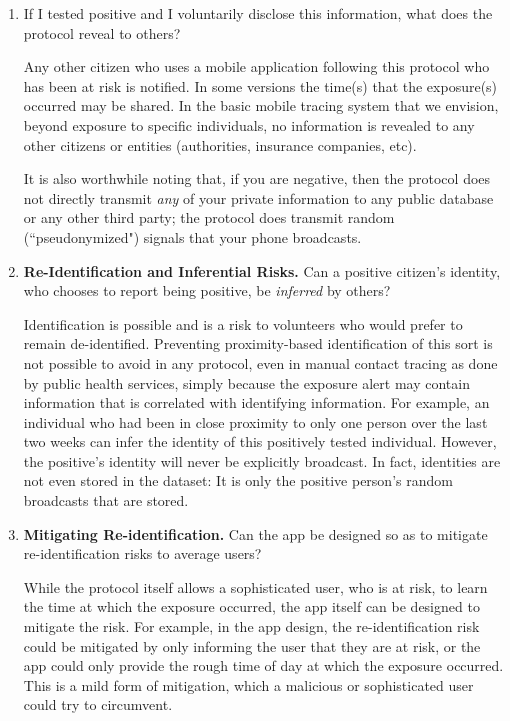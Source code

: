 \begin{enumerate}[leftmargin=*]
\item If I tested positive and I voluntarily disclose this information, what does the protocol reveal to others?

Any other citizen who uses a mobile application following this protocol who has been at risk is notified. In some versions the time(s) that the exposure(s) occurred may be shared.  In the basic mobile tracing system that we envision, beyond exposure to specific individuals, no information is revealed to any other citizens or entities (authorities, insurance companies, etc). 

It is also worthwhile noting that, if you are negative, then the protocol does not directly transmit \emph{any} of your private information to any public database or any other third party; the protocol does transmit random (``pseudonymized") signals that your phone broadcasts. 

\item \textbf{Re-Identification and Inferential Risks.} Can a positive citizen's identity, who chooses to report being positive, be \emph{inferred} by others? 

Identification is possible and is a risk to volunteers who would prefer to remain de-identified.  Preventing proximity-based identification of this sort is not possible to avoid in any protocol, even in manual contact tracing as done by public health services, simply because the exposure alert may contain information that is correlated with identifying information.
For example, an individual who had been in close proximity to only one person over the last two weeks can infer the identity of this positively tested individual. 
However, the positive's identity will never be explicitly broadcast. In fact, identities are not even stored in the dataset: It is only the positive person's random broadcasts that are stored.

\item \textbf{Mitigating Re-identification.} Can the app be designed so as to mitigate re-identification risks to average users?

While the protocol itself allows a sophisticated user, who is at risk, to learn the time at which the exposure occurred, the app itself can be designed to mitigate the risk. For example, in the app design, the re-identification risk could be mitigated by only informing the user that they are at risk, or the app could only provide the rough time of day at which the exposure occurred.  This is a mild form of mitigation, which a malicious or sophisticated user could try to circumvent.

\end{enumerate}

